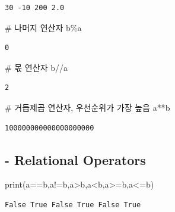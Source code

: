 \documentclass[
  letterpaper,
  DIV=11,
  numbers=noendperiod]{scrreprt}
\newenvironment{Shaded}{\begin{snugshade}}{\end{snugshade}}
\newcommand{\BuiltInTok}[1]{\textcolor[rgb]{0.00,0.23,0.31}{#1}}
\newcommand{\CommentTok}[1]{\textcolor[rgb]{0.37,0.37,0.37}{#1}}
\newcommand{\NormalTok}[1]{\textcolor[rgb]{0.00,0.23,0.31}{#1}}
\newcommand{\OperatorTok}[1]{\textcolor[rgb]{0.37,0.37,0.37}{#1}}
\begin{document}
\begin{verbatim}
30 -10 200 2.0
\end{verbatim}

\begin{Shaded}
\begin{Highlighting}[]
\CommentTok{\# 나머지 연산자}
\NormalTok{b}\OperatorTok{\%}\NormalTok{a}
\end{Highlighting}
\end{Shaded}

\begin{verbatim}
0
\end{verbatim}

\begin{Shaded}
\begin{Highlighting}[]
\CommentTok{\# 몫 연산자}
\NormalTok{b}\OperatorTok{//}\NormalTok{a}
\end{Highlighting}
\end{Shaded}

\begin{verbatim}
2
\end{verbatim}

\begin{Shaded}
\begin{Highlighting}[]
\CommentTok{\# 거듭제곱 연산자, 우선순위가 가장 높음}
\NormalTok{a}\OperatorTok{**}\NormalTok{b}
\end{Highlighting}
\end{Shaded}

\begin{verbatim}
100000000000000000000
\end{verbatim}

\subsection{- Relational Operators}\label{relational-operators}

\begin{Shaded}
\begin{Highlighting}[]
\BuiltInTok{print}\NormalTok{(a}\OperatorTok{==}\NormalTok{b,a}\OperatorTok{!=}\NormalTok{b,a}\OperatorTok{\textgreater{}}\NormalTok{b,a}\OperatorTok{\textless{}}\NormalTok{b,a}\OperatorTok{\textgreater{}=}\NormalTok{b,a}\OperatorTok{\textless{}=}\NormalTok{b)}
\end{Highlighting}
\end{Shaded}

\begin{verbatim}
False True False True False True
\end{verbatim}
\end{document}
